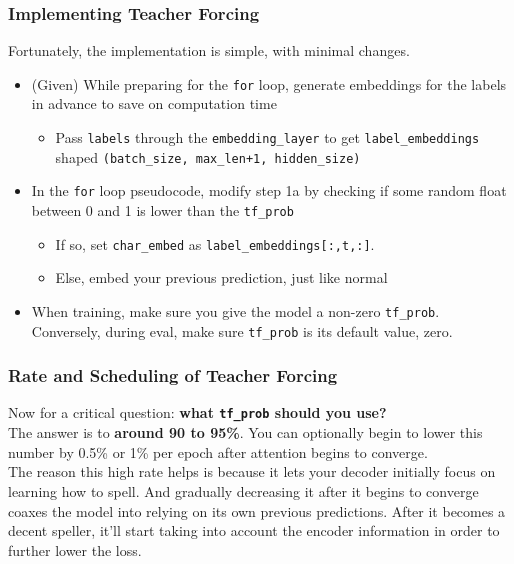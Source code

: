 \documentclass{article}
\newcommand{\ttt}[1]{\texttt{#1}}
\begin{document}
\subsubsection{Implementing Teacher Forcing}

Fortunately, the implementation is simple, with minimal changes.

\begin{itemize}
    \item (Given) While preparing for the \ttt{for} loop, generate embeddings for the labels in advance to save on computation time
    \begin{itemize}
        \item Pass \ttt{labels} through the \ttt{embedding\_layer} to get \ttt{label\_embeddings} shaped \ttt{(batch\_size, max\_len+1, hidden\_size)}
    \end{itemize}
    \item In the \ttt{for} loop pseudocode, modify step 1a by checking if some random float between 0 and 1 is lower than the \ttt{tf\_prob}
        \begin{itemize}
            \item If so, set \ttt{char\_embed} as \ttt{label\_embeddings[:,t,:]}.
            \item Else, embed your previous prediction, just like normal
        \end{itemize}
    \item When training, make sure you give the model a non-zero \ttt{tf\_prob}. Conversely, during eval, make sure \ttt{tf\_prob} is its default value, zero. 
\end{itemize}

\subsubsection{Rate and Scheduling of Teacher Forcing}

Now for a critical question: \textbf{what \ttt{tf\_prob} should you use?} \\

The answer is to \textbf{around 90 to 95\%}. You can optionally begin to lower this number by 0.5\% or 1\% per epoch after attention begins to converge. \\

The reason this high rate helps is because it lets your decoder initially focus on learning how to spell. And gradually decreasing it after it begins to converge coaxes the model into relying on its own previous predictions. After it becomes a decent speller, it'll start taking into account the encoder information in order to further lower the loss.
\end{document}
